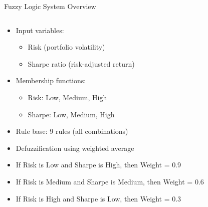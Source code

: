 \documentclass[aspectratio=169,xcolor=table]{beamer}
\begin{document}
\begin{frame}{Fuzzy Logic System Overview}
  \begin{columns}
    \begin{column}{0.5\textwidth}
      \begin{tcolorbox}[
        enhanced,
        colback=blue!5,
        colframe=blue!70,
        arc=2mm,
        title=Fuzzy Inference System Components,
        fonttitle=\bfseries\large,
        boxrule=0.5mm
      ]
        \begin{itemize}
          \item Input variables:
            \begin{itemize}
              \item Risk (portfolio volatility)
              \item Sharpe ratio (risk-adjusted return)
            \end{itemize}
          \item Membership functions:
            \begin{itemize}
              \item Risk: Low, Medium, High
              \item Sharpe: Low, Medium, High
            \end{itemize}
          \item Rule base: 9 rules (all combinations)
          \item Defuzzification using weighted average
        \end{itemize}
      \end{tcolorbox}
      
      \vspace{0.3cm}
      
      \begin{tcolorbox}[
        enhanced,
        colback=green!5,
        colframe=green!70,
        arc=2mm,
        title=Example Rules,
        fonttitle=\bfseries\large,
        boxrule=0.5mm
      ]
        \begin{itemize}
          \item If Risk is Low and Sharpe is High, then Weight = 0.9
          \item If Risk is Medium and Sharpe is Medium, then Weight = 0.6
          \item If Risk is High and Sharpe is Low, then Weight = 0.3
        \end{itemize}
      \end{tcolorbox}
    \end{column}
    

\end{columns}
\end{frame}
\end{document}

